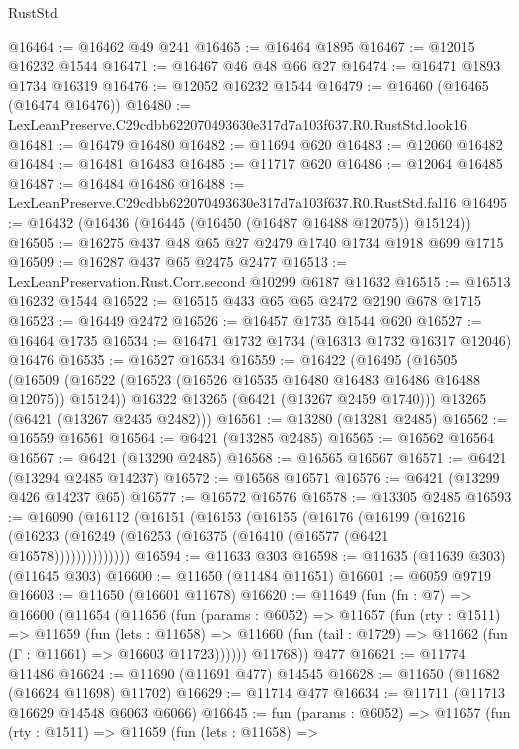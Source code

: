 \begin{lexlean}{RustStd}
\begin{coremodule}
@16464 := @16462 @49 @241
@16465 := @16464 @1895
@16467 := @12015 @16232 @1544
@16471 := @16467 @46 @48 @66 @27
@16474 := @16471 @1893 @1734 @16319
@16476 := @12052 @16232 @1544
@16479 := @16460 (@16465 (@16474 @16476))
@16480 := LexLeanPreserve.C29cdbb622070493630e317d7a103f637.R0.RustStd.look16
@16481 := @16479 @16480
@16482 := @11694 @620
@16483 := @12060 @16482
@16484 := @16481 @16483
@16485 := @11717 @620
@16486 := @12064 @16485
@16487 := @16484 @16486
@16488 := LexLeanPreserve.C29cdbb622070493630e317d7a103f637.R0.RustStd.fal16
@16495 := @16432 (@16436 (@16445 (@16450 (@16487 @16488 @12075)) @15124))
@16505 := @16275 @437 @48 @65 @27 @2479 @1740 @1734 @1918 @699 @1715
@16509 := @16287 @437 @65 @2475 @2477
@16513 := LexLeanPreservation.Rust.Corr.second @10299 @6187 @11632
@16515 := @16513 @16232 @1544
@16522 := @16515 @433 @65 @65 @2472 @2190 @678 @1715
@16523 := @16449 @2472
@16526 := @16457 @1735 @1544 @620
@16527 := @16464 @1735
@16534 := @16471 @1732 @1734 (@16313 @1732 @16317 @12046) @16476
@16535 := @16527 @16534
@16559 := @16422
    (@16495
      (@16505
        (@16509 (@16522 (@16523 (@16526 @16535 @16480 @16483 @16486 @16488 @12075)) @15124))
        @16322
        @13265
        (@6421 (@13267 @2459 @1740)))
      @13265
      (@6421 (@13267 @2435 @2482)))
@16561 := @13280 (@13281 @2485)
@16562 := @16559 @16561
@16564 := @6421 (@13285 @2485)
@16565 := @16562 @16564
@16567 := @6421 (@13290 @2485)
@16568 := @16565 @16567
@16571 := @6421 (@13294 @2485 @14237)
@16572 := @16568 @16571
@16576 := @6421 (@13299 @426 @14237 @65)
@16577 := @16572 @16576
@16578 := @13305 @2485
@16593 := @16090
    (@16112
      (@16151
        (@16153
          (@16155
            (@16176
              (@16199
                (@16216 (@16233 (@16249 (@16253 (@16375 (@16410 (@16577 (@6421 @16578))))))))))))))
@16594 := @11633 @303
@16598 := @11635 (@11639 @303) (@11645 @303)
@16600 := @11650 (@11484 @11651)
@16601 := @6059 @9719
@16603 := @11650 (@16601 @11678)
@16620 := @11649
    (fun (fn : @7) =>
    @16600
      (@11654
        (@11656
          (fun (params : @6052) =>
          @11657
            (fun (rty : @1511) =>
            @11659
              (fun (lets : @11658) =>
              @11660 (fun (tail : @1729) => @11662 (fun (Γ : @11661) => @16603 @11723))))))
        @11768))
    @477
@16621 := @11774 @11486
@16624 := @11690 (@11691 @477) @14545
@16628 := @11650 (@11682 (@16624 @11698) @11702)
@16629 := @11714 @477
@16634 := @11711 (@11713 @16629 @14548 @6063 @6066)
@16645 := fun (params : @6052) =>
  @11657
    (fun (rty : @1511) =>
    @11659
      (fun (lets : @11658) =>

\end{coremodule}
\end{lexlean}
